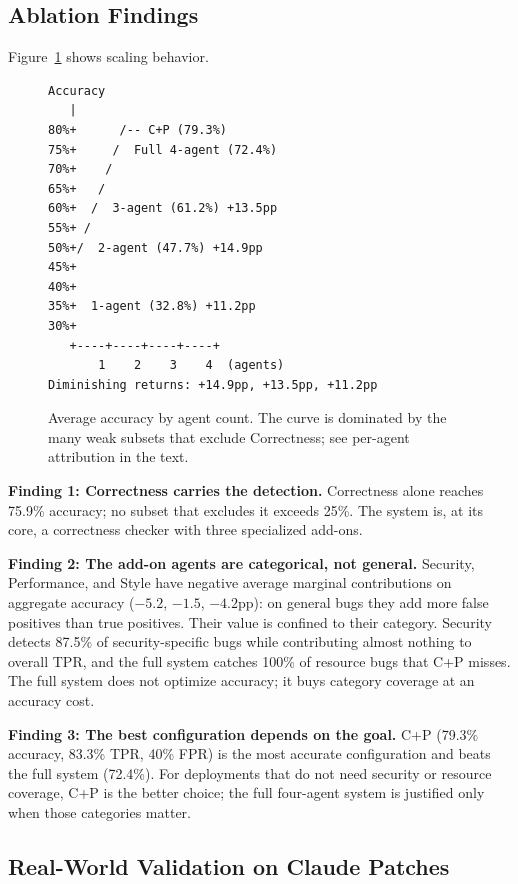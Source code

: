 \documentclass[10pt,twocolumn]{article}
\begin{document}
\subsection{Ablation Findings}

Figure~\ref{fig:ablation_scaling} shows scaling behavior.

\begin{figure}[t]
\centering
\footnotesize
\begin{verbatim}
Accuracy
   |
80%+      /-- C+P (79.3%)
75%+     /  Full 4-agent (72.4%)
70%+    /
65%+   /
60%+  /  3-agent (61.2%) +13.5pp
55%+ /
50%+/  2-agent (47.7%) +14.9pp
45%+
40%+
35%+  1-agent (32.8%) +11.2pp
30%+
   +----+----+----+----+
       1    2    3    4  (agents)
Diminishing returns: +14.9pp, +13.5pp, +11.2pp
\end{verbatim}
\caption{Average accuracy by agent count. The curve is dominated by the many weak subsets that exclude Correctness; see per-agent attribution in the text.}
\label{fig:ablation_scaling}
\end{figure}

\textbf{Finding 1: Correctness carries the detection.} Correctness alone reaches 75.9\% accuracy; no subset that excludes it exceeds 25\%. The system is, at its core, a correctness checker with three specialized add-ons.

\textbf{Finding 2: The add-on agents are categorical, not general.} Security, Performance, and Style have negative average marginal contributions on aggregate accuracy ($-5.2$, $-1.5$, $-4.2$pp): on general bugs they add more false positives than true positives. Their value is confined to their category. Security detects 87.5\% of security-specific bugs while contributing almost nothing to overall TPR, and the full system catches 100\% of resource bugs that C+P misses. The full system does not optimize accuracy; it buys category coverage at an accuracy cost.

\textbf{Finding 3: The best configuration depends on the goal.} C+P (79.3\% accuracy, 83.3\% TPR, 40\% FPR) is the most accurate configuration and beats the full system (72.4\%). For deployments that do not need security or resource coverage, C+P is the better choice; the full four-agent system is justified only when those categories matter.

\subsection{Real-World Validation on Claude Patches}
\end{document}
